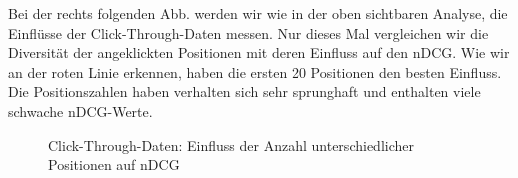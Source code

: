 \begin{minipage}{0.40\linewidth}
Bei der rechts folgenden Abb. werden wir wie in der oben sichtbaren Analyse, die Einflüsse der Click-Through-Daten messen. Nur dieses Mal vergleichen wir die Diversität der angeklickten Positionen mit deren Einfluss auf den nDCG. Wie wir an der roten Linie erkennen, haben die ersten 20 Positionen den besten Einfluss. Die Positionszahlen haben verhalten sich sehr sprunghaft und enthalten viele schwache nDCG-Werte.
\end{minipage}
\hfill
\begin{minipage}{0.55\linewidth}
\begin{figure}[H]
\centering 
\vspace{-1em}
\caption[Click-Through-Daten: Einfluss der Anzahl unterschiedlicher Positionen auf nDCG]{Click-Through-Daten: Einfluss der Anzahl unterschiedlicher Positionen auf nDCG}
\label{fig:Evaluation:Auswertung:RanksNDCG}

\footnotesize
{}\ranks
\pgfsetplotmarksize{.0pt}
  

\vspace{-1.5em}
\end{figure}
\end{minipage}
